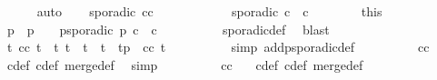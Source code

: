 \begin{isabellebody}
\ \ \ \ \isamarkupfalse%
\ auto\isanewline
\isanewline
\ \ \isamarkupfalse%
\ {\isacartoucheopen}{\isasymnot}sporadic\ {\isacharparenleft}c{\isasymoplus}c{\isacharprime}{\isacharparenright}{\isacartoucheclose}\isanewline
\ \ \isamarkupfalse%
\ {\isacharminus}\isanewline
\ \ \ \ \isacommand{{\isacharbraceleft}}\isamarkupfalse%
\ \isamarkupfalse%
\ {\isacartoucheopen}sporadic\ {\isacharparenleft}c\ {\isasymoplus}\ c{\isacharprime}{\isacharparenright}{\isacartoucheclose}\isanewline
\ \ \ \ \ \ \isamarkupfalse%
\ this\ \isamarkupfalse%
\ p\ \ {\isacharasterisk}{\isacharcolon}{\isacartoucheopen}p\ {\isachargreater}\ {}{\isacartoucheclose}\ \ {\isacartoucheopen}p{\isacharunderscore}sporadic\ p\ {\isacharparenleft}c\ {\isasymoplus}\ c{\isacharprime}{\isacharparenright}{\isacartoucheclose}\isanewline
\ \ \ \ \ \ \ \ \isamarkupfalse%
\ sporadic{\isacharunderscore}def\ \isamarkupfalse%
\ blast\isanewline
\ \ \ \ \ \ \isamarkupfalse%
\ {\isacartoucheopen}{\isasymforall}t{\isachardot}\ {\isacharparenleft}c{\isasymoplus}c{\isacharprime}{\isacharparenright}\ t\ {\isasymlongrightarrow}\ {\isacharparenleft}{\isasymforall}t{\isacharprime}{\isachardot}\ {\isacharparenleft}t\ {\isacharless}\ t{\isacharprime}\ {\isasymand}\ t{\isacharprime}\ {\isasymle}\ t{\isacharplus}p{\isacharparenright}\ {\isasymlongrightarrow}\ {\isasymnot}{\isacharparenleft}{\isacharparenleft}c{\isasymoplus}c{\isacharprime}{\isacharparenright}\ t{\isacharprime}{\isacharparenright}{\isacharparenright}{\isacartoucheclose}\isanewline
\ \ \ \ \ \ \ \ \isamarkupfalse%
\ {\isacharparenleft}simp\ add{\isacharcolon}p{\isacharunderscore}sporadic{\isacharunderscore}def{\isacharparenright}\isanewline
\ \ \ \ \ \ \isamarkupfalse%
\ \isamarkupfalse%
\ {\isacartoucheopen}{\isacharparenleft}c{\isasymoplus}c{\isacharprime}{\isacharparenright}\ {}{\isacartoucheclose}\ \isamarkupfalse%
\ c{\isacharunderscore}def\ c{\isacharprime}{\isacharunderscore}def\ merge{\isacharunderscore}def\ \isamarkupfalse%
\ simp\isanewline
\ \ \ \ \ \ \isamarkupfalse%
\ \isamarkupfalse%
\ {\isacartoucheopen}{\isacharparenleft}c{\isasymoplus}c{\isacharprime}{\isacharparenright}\ {}{\isacartoucheclose}\ \isamarkupfalse%
\ c{\isacharunderscore}def\ c{\isacharprime}{\isacharunderscore}def\ merge{\isacharunderscore}def\ \isamarkupfalse%

\end{isabellebody}
